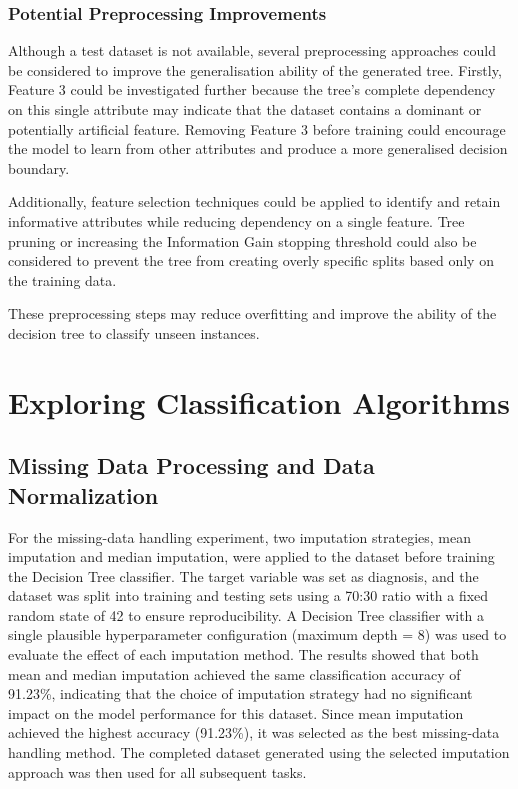 \documentclass[a4paper,12pt]{article}
\begin{document}
\subsubsection{Potential Preprocessing Improvements}

Although a test dataset is not available, several preprocessing approaches could
be considered to improve the generalisation ability of the generated tree.
Firstly, Feature 3 could be investigated further because the tree's complete
dependency on this single attribute may indicate that the dataset contains a
dominant or potentially artificial feature. Removing Feature 3 before training
could encourage the model to learn from other attributes and produce a more
generalised decision boundary.

Additionally, feature selection techniques could be applied to identify and
retain informative attributes while reducing dependency on a single feature.
Tree pruning or increasing the Information Gain stopping threshold could also be
considered to prevent the tree from creating overly specific splits based only on
the training data.

These preprocessing steps may reduce overfitting and improve the ability of the
decision tree to classify unseen instances.

\section{Exploring Classification Algorithms}
\subsection{Missing Data Processing and Data Normalization}
For the missing-data handling experiment, two imputation strategies, mean imputation and median imputation, were applied to the dataset before training the Decision Tree classifier. The target variable was set as diagnosis, and the dataset was split into training and testing sets using a 70:30 ratio with a fixed random state of 42 to ensure reproducibility. A Decision Tree classifier with a single plausible hyperparameter configuration (maximum depth = 8) was used to evaluate the effect of each imputation method. The results showed that both mean and median imputation achieved the same classification accuracy of 91.23\%, indicating that the choice of imputation strategy had no significant impact on the model performance for this dataset. Since mean imputation achieved the highest accuracy (91.23\%), it was selected as the best missing-data handling method. The completed dataset generated using the selected imputation approach was then used for all subsequent tasks.
\end{document}
